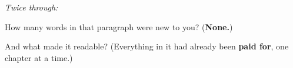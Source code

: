 \emph{Twice through:}

\begin{tcolorbox}[breakable,colback=teal!4,colframe=teal!35!black,title={Before you move on}]
How many words in that paragraph were new to you? (\textbf{None.})

And what made it readable? (Everything in it had already been \textbf{paid for}, one chapter at a time.)
\end{tcolorbox}

